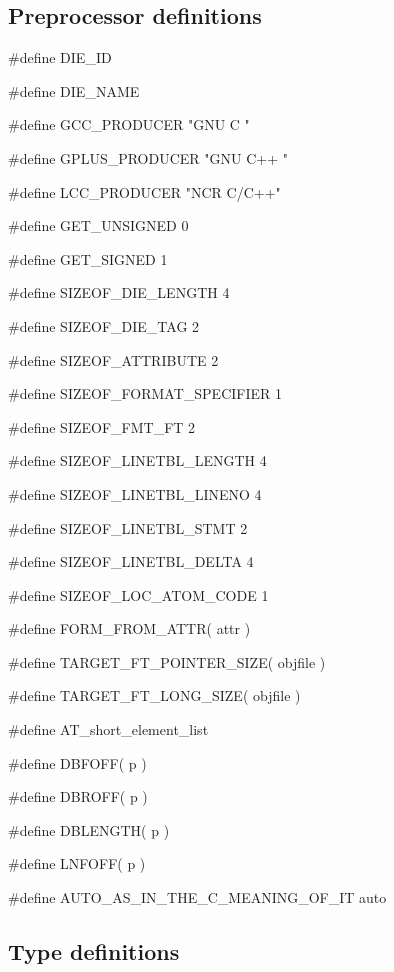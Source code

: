 \subsection*{Preprocessor definitions}

{\stt \#define DIE\_ID}

\medskip
{\stt \#define DIE\_NAME}

\medskip
{\stt \#define GCC\_PRODUCER "GNU C "}

\medskip
{\stt \#define GPLUS\_PRODUCER "GNU C++ "}

\medskip
{\stt \#define LCC\_PRODUCER "NCR C/C++"}

\medskip
{\stt \#define GET\_UNSIGNED 0}

\medskip
{\stt \#define GET\_SIGNED 1}

\medskip
{\stt \#define SIZEOF\_DIE\_LENGTH 4}

\medskip
{\stt \#define SIZEOF\_DIE\_TAG 2}

\medskip
{\stt \#define SIZEOF\_ATTRIBUTE 2}

\medskip
{\stt \#define SIZEOF\_FORMAT\_SPECIFIER 1}

\medskip
{\stt \#define SIZEOF\_FMT\_FT 2}

\medskip
{\stt \#define SIZEOF\_LINETBL\_LENGTH 4}

\medskip
{\stt \#define SIZEOF\_LINETBL\_LINENO 4}

\medskip
{\stt \#define SIZEOF\_LINETBL\_STMT 2}

\medskip
{\stt \#define SIZEOF\_LINETBL\_DELTA 4}

\medskip
{\stt \#define SIZEOF\_LOC\_ATOM\_CODE 1}

\medskip
{\stt \#define FORM\_FROM\_ATTR( attr )}

\medskip
{\stt \#define TARGET\_FT\_POINTER\_SIZE( objfile )}

\medskip
{\stt \#define TARGET\_FT\_LONG\_SIZE( objfile )}

\medskip
{\stt \#define AT\_short\_element\_list}

\medskip
{\stt \#define DBFOFF( p )}

\medskip
{\stt \#define DBROFF( p )}

\medskip
{\stt \#define DBLENGTH( p )}

\medskip
{\stt \#define LNFOFF( p )}

\medskip
{\stt \#define AUTO\_AS\_IN\_THE\_C\_MEANING\_OF\_IT auto}


\subsection{Type definitions}


